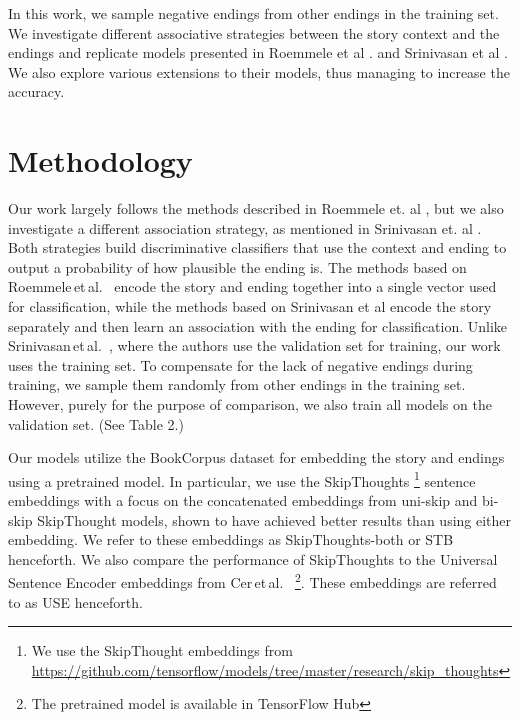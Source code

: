 \documentclass{article}
\begin{document}
In this work, we sample negative endings from other endings in the training set. We investigate different associative strategies between the story context and the endings and replicate models presented in Roemmele et al \citep{Roemmele2017AnTest}. and Srinivasan et al \citep{Srinivasan2018ATest}. We also explore various extensions to their models, thus managing to increase the accuracy.

\section{Methodology}
Our work largely follows the methods described in Roemmele et. al \citep{Roemmele2017AnTest}, but we also investigate a different association strategy, as mentioned in Srinivasan et. al \citep{Srinivasan2018ATest}. Both strategies build discriminative classifiers that use the context and ending to output a probability of how plausible the ending is. The methods based on Roemmele\,et\,al.\ \citep{Roemmele2017AnTest} encode the story and ending together into a single vector used for classification, while the methods based on Srinivasan et al encode the story separately and then learn an association with the ending for classification. Unlike Srinivasan\,et\,al.\ \citep{Srinivasan2018ATest}, where the authors use the validation set for training, our work uses the training set. To compensate for the lack of negative endings during training, we sample them randomly from other endings in the training set. However, purely for the purpose of comparison, we also train all models on the validation set. (See Table 2.)

Our models utilize the BookCorpus dataset \citep{Zhu2015AligningBooks} for embedding the story and endings using a pretrained model. In particular, we use the SkipThoughts \citep{Kiros2015Skip-ThoughtVectors}\footnote{We use the SkipThought embeddings from \url{https://github.com/tensorflow/models/tree/master/research/skip_thoughts}} sentence embeddings with a focus on the concatenated embeddings from uni-skip and bi-skip SkipThought models, shown to have achieved better results than using either embedding. We refer to these embeddings as SkipThoughts-both or STB henceforth. We also compare the performance of SkipThoughts to the Universal Sentence Encoder embeddings from Cer\,et\,al.\ \citep{2018arXiv180311175C} \footnote{The pretrained model is available in TensorFlow Hub}. These embeddings are referred to as USE henceforth.
\end{document}
